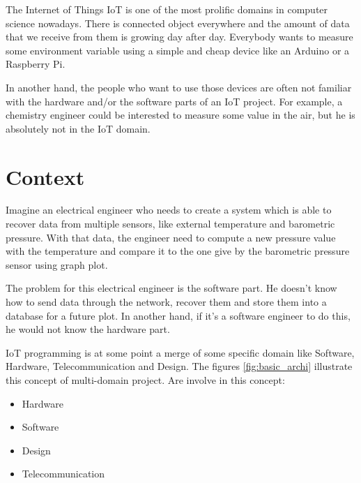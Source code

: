 \label{cha:introduction}

The Internet of Things \gls{IoT} is one of the most prolific domains in computer science
nowadays. There is connected object everywhere and the amount of data that we
receive from them is growing day after day. Everybody wants to measure some
environment variable using a simple and cheap device like an Arduino or a
Raspberry Pi.

In another hand, the people who want to use those devices are often not familiar
with the hardware and/or the software parts of an IoT project. For example, a
chemistry engineer could be interested to measure some value in the air, but he
is absolutely not in the IoT domain.

\section{Context}
\label{sec:intro-context}

Imagine an electrical engineer who needs to create a system which is able to
recover data from multiple sensors, like external temperature and barometric
pressure. With that data, the engineer need to compute a new pressure value
with the temperature and compare it to the one give by the barometric pressure
sensor using graph plot.

The problem for this electrical engineer is the software part. He doesn’t know how
to send data through the network, recover them and store them into a database
for a future plot. In another hand, if it’s a software engineer to do this, he
would not know the hardware part.

IoT programming is at some point a merge of some specific domain like Software,
Hardware, Telecommunication and Design. The figures \ref{fig:basic_archi} illustrate
this concept of multi-domain project. Are involve in this concept:

\begin{itemize}
\item Hardware
\item Software
\item Design
\item Telecommunication
\end{itemize}

